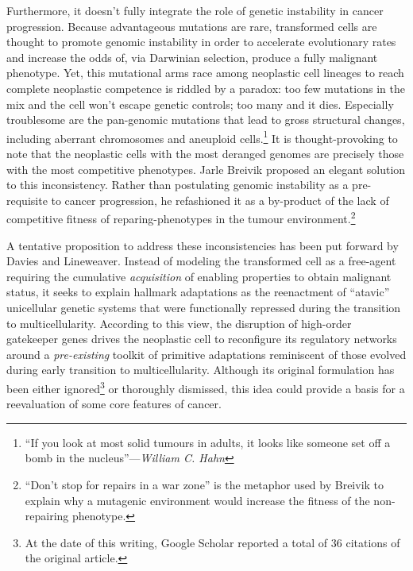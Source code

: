 Furthermore, it doesn't fully integrate the role of genetic
instability in cancer progression.  Because advantageous mutations are
rare, transformed cells are thought to promote genomic instability in
order to accelerate evolutionary rates and increase the odds of, via
Darwinian selection, produce a fully malignant
phenotype.\cite{sieber_genomic_2003} Yet, this mutational arms race
among neoplastic cell lineages to reach complete neoplastic competence
is riddled by a paradox: too few mutations in the mix and the cell
won't escape genetic controls; too many and it dies.  Especially
troublesome are the \mbox{pan-genomic} mutations that lead to gross
structural changes, including aberrant chromosomes and aneuploid
cells.\footnote{``If you look at most solid tumours in adults, it
  looks like someone set off a bomb in the nucleus''---\emph{William
    C. Hahn}} It is thought-provoking to note that the neoplastic
cells with the most deranged genomes are precisely those with the most
competitive phenotypes.  Jarle Breivik proposed an elegant solution to
this inconsistency.\cite{breivik_evolutionary_2005} Rather than
postulating genomic instability as a pre-requisite to cancer
progression, he refashioned it as a \mbox{by-product} of the lack of
competitive fitness of reparing-phenotypes in the tumour
environment.\footnote{``Don't stop for repairs in a war zone'' is the
  metaphor used by Breivik to explain why a mutagenic environment
  would increase the fitness of the non-repairing
  phenotype.  %
}

A tentative proposition to address these inconsistencies has been put forward by
Davies and Lineweaver.\cite{davies_cancer_2011} Instead of modeling the
transformed cell as a free-agent requiring the cumulative \emph{acquisition} of
enabling properties to obtain malignant status, it seeks to explain hallmark
adaptations as the reenactment of ``atavic'' unicellular genetic systems that
were functionally repressed during the transition to multicellularity.
According to this view, the disruption of high-order gatekeeper genes drives the
neoplastic cell to reconfigure its regulatory networks around a
\emph{pre-existing} toolkit of primitive adaptations reminiscent of those
evolved during early transition to multicellularity.  Although its original
formulation has been either ignored\footnote{At the date of this writing, Google
  Scholar reported a total of 36 citations of the original article.} or
thoroughly dismissed,\cite{pettit_cancer_2012,myers_aaargh!_2012} this idea
could provide a basis for a reevaluation of some core features of cancer.

